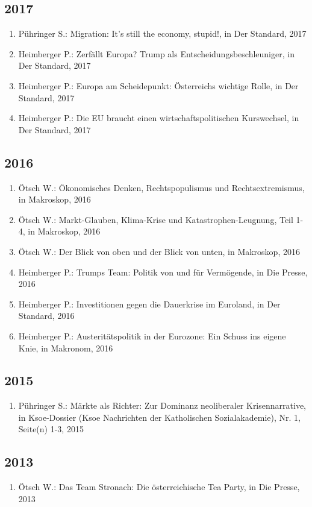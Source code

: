 \subsection*{2017}
\begin{enumerate}
    	 \item Pühringer S.: Migration: It's still the economy, stupid!, in Der Standard, 2017
	 \item Heimberger P.: Zerfällt Europa? Trump als Entscheidungsbeschleuniger, in Der Standard, 2017
	 \item Heimberger P.: Europa am Scheidepunkt: Österreichs wichtige Rolle, in Der Standard, 2017
	 \item Heimberger P.: Die EU braucht einen wirtschaftspolitischen Kurswechsel, in Der Standard, 2017
\end{enumerate}
\subsection*{2016}
\begin{enumerate}
    	 \item Ötsch W.: Ökonomisches Denken, Rechtspopulismus und Rechtsextremismus, in Makroskop, 2016
	 \item Ötsch W.: Markt-Glauben, Klima-Krise und Katastrophen-Leugnung, Teil 1-4, in Makroskop, 2016
	 \item Ötsch W.: Der Blick von oben und der Blick von unten, in Makroskop, 2016
	 \item Heimberger P.: Trumps Team: Politik von und für Vermögende, in Die Presse, 2016
	 \item Heimberger P.: Investitionen gegen die Dauerkrise im Euroland, in Der Standard, 2016
	 \item Heimberger P.: Austeritätspolitik in der Eurozone: Ein Schuss ins eigene Knie, in Makronom, 2016
\end{enumerate}
\subsection*{2015}
\begin{enumerate}
    	 \item Pühringer S.: Märkte als Richter: Zur Dominanz neoliberaler Krisennarrative, in Ksoe-Dossier (Ksoe Nachrichten der Katholischen Sozialakademie), Nr. 1, Seite(n) 1-3, 2015
\end{enumerate}
\subsection*{2013}
\begin{enumerate}
    	 \item Ötsch W.: Das Team Stronach: Die österreichische Tea Party, in Die Presse, 2013
\end{enumerate}
